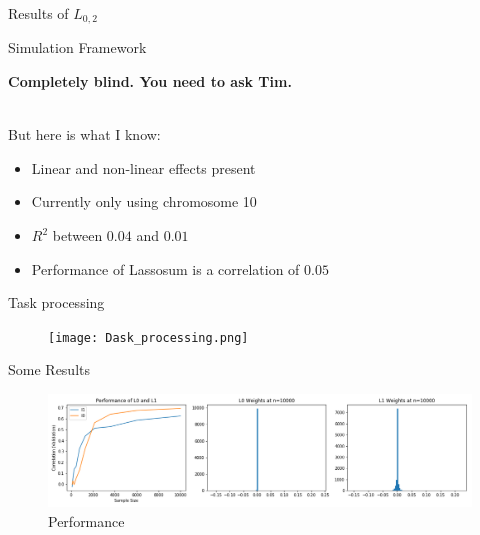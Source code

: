 \documentclass{beamer}
\begin{document}
\begin{frame}[t]{Results of $L_{0,2}$}
  
\end{frame}

\begin{frame}[t]{Simulation Framework}
  \begin{center}
  \textbf{Completely blind. You need to ask Tim.}
  \end{center}
  \\
  But here is what I know:
  \begin{itemize}
    \item Linear and non-linear effects present
    \item Currently only using chromosome 10
    \item $R^2$ between $0.04$ and $0.01$
    \item Performance of Lassosum is a correlation of $0.05$
  \end{itemize}
\end{frame}

\begin{frame}[t]{Task processing}
  \begin{figure}[htpb]
    \centering
    \texttt{[image: Dask\_processing.png]}
  \end{figure} 
\end{frame}

\begin{frame}[t]{Some Results}
  \begin{figure}[htpb]
    \centering
    \includegraphics[width=0.99\linewidth]{performance.png}
    \caption{Performance}
  \end{figure}
\end{frame}
\end{document}
